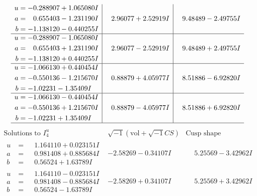 \documentclass[1p]{elsarticle_modified}
\theoremstyle{definition}
\newcommand{\I}{\sqrt{-1}}
\begin{document}
$$\begin{array}{c|c|c}
\begin{aligned}
u &= -0.288907 + 1.065080 I \\
a &= \phantom{-}0.655403 - 1.231190 I \\
b &= -1.138120 - 0.440255 I\end{aligned}
 & \phantom{-}2.96077 + 2.52919 I & \phantom{-}9.48489 - 2.49755 I \\ \hline\begin{aligned}
u &= -0.288907 - 1.065080 I \\
a &= \phantom{-}0.655403 + 1.231190 I \\
b &= -1.138120 + 0.440255 I\end{aligned}
 & \phantom{-}2.96077 - 2.52919 I & \phantom{-}9.48489 + 2.49755 I \\ \hline\begin{aligned}
u &= -1.066130 + 0.440454 I \\
a &= -0.550136 - 1.215670 I \\
b &= -1.02231 - 1.35409 I\end{aligned}
 & \phantom{-}0.88879 + 4.05977 I & \phantom{-}8.51886 - 6.92820 I \\ \hline\begin{aligned}
u &= -1.066130 - 0.440454 I \\
a &= -0.550136 + 1.215670 I \\
b &= -1.02231 + 1.35409 I\end{aligned}
 & \phantom{-}0.88879 - 4.05977 I & \phantom{-}8.51886 + 6.92820 I\\
 \hline 
 \end{array}$$\newpage$$\begin{array}{c|c|c}  
\text{Solutions to }I^u_{4}& \I (\text{vol} + \sqrt{-1}CS) & \text{Cusp shape}\\
 \hline 
\begin{aligned}
u &= \phantom{-}1.164110 + 0.023151 I \\
a &= \phantom{-}0.981408 + 0.885684 I \\
b &= \phantom{-}0.56524 + 1.63789 I\end{aligned}
 & -2.58269 - 0.34107 I & \phantom{-}5.25569 - 3.42962 I \\ \hline\begin{aligned}
u &= \phantom{-}1.164110 - 0.023151 I \\
a &= \phantom{-}0.981408 - 0.885684 I \\
b &= \phantom{-}0.56524 - 1.63789 I\end{aligned}
 & -2.58269 + 0.34107 I & \phantom{-}5.25569 + 3.42962 I \\ \hline\begin{aligned}

\end{aligned}
\end{array}$$
\end{document}
